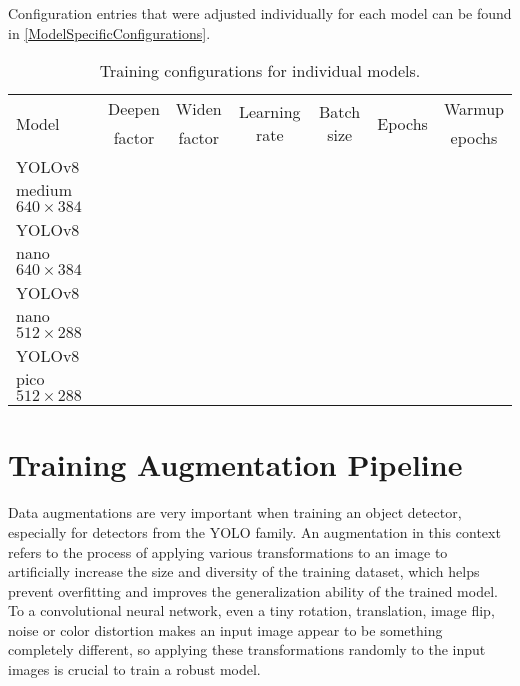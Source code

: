Configuration entries that were adjusted individually for each model can be
found in \autoref{ModelSpecificConfigurations}.

\begin{table}[h]
\centering
\label{ModelSpecificConfigurations}
\small
\begin{tabular}{|p{3cm}|c|c|c|c|c|c|}
    \hline
    \multirow{2}{*}{Model} & Deepen & Widen & \multirow{2}{*}{Learning rate} & \multirow{2}{*}{Batch size} & \multirow{2}{*}{Epochs} & Warmup \\
    & factor & factor & & & & epochs \\
    \hline
    YOLOv8 medium \newline $640 \times 384$ & & & & & & \\
    \hline
    YOLOv8 nano \newline $640 \times 384$   & & & & & & \\
    \hline
    YOLOv8 nano \newline $512 \times 288$   & & & & & & \\
    \hline
    YOLOv8 pico \newline $512 \times 288$   & & & & & & \\
    \hline
\end{tabular}
\caption{Training configurations for individual models.}
\end{table}


\section{Training Augmentation Pipeline}

Data augmentations are very important when training an object detector,
especially for detectors from the YOLO family. An augmentation in this context
refers to the process of applying various transformations to an image to
artificially increase the size and diversity of the training dataset, which
helps prevent overfitting and improves the generalization ability of the trained
model. To a convolutional neural network, even a tiny rotation, translation,
image flip, noise or color distortion makes an input image appear to be
something completely different, so applying these transformations randomly to
the input images is crucial to train a robust model.


